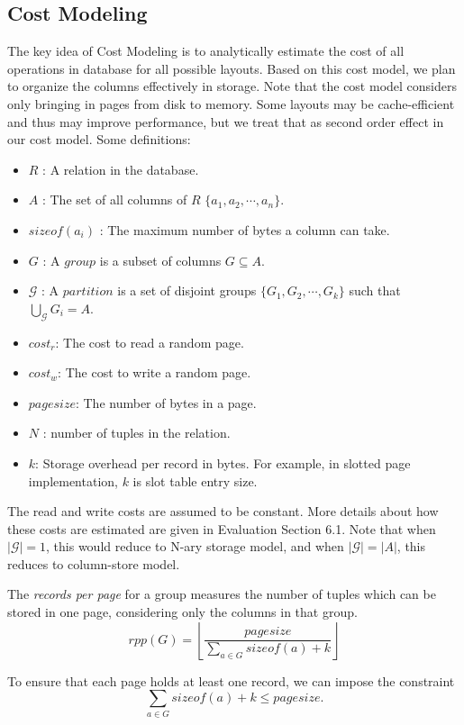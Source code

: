 \documentclass[twocolumn,11pt]{article}
\newcommand{\g}{\mathcal{G}}
\begin{document}
\subsection{Cost Modeling}

The key idea of Cost Modeling is to analytically estimate the cost of all operations in database for all possible layouts. Based on this cost model, we plan to organize the columns effectively in storage. Note that the cost model considers only bringing in pages from disk to memory. Some layouts may be cache-efficient and thus may improve performance, but we treat that as second order effect in our cost model.
Some definitions:
\begin{itemize}
\item $R$	  	: A relation in the database.
\item $A$	  	: The set of all columns of $R$ $\{a_1,a_2,\cdots,a_n\}$.
\item $sizeof(a_i)$ : The maximum number of bytes a column can take.
\item $G$	  	: A $group$ is a subset of columns $G \subseteq A$.
\item $\g$  	:	A $partition$ is a set of disjoint groups $\{G_1,G_2,\cdots,G_k\}$ such that $ \bigcup_{\g} G_i = A$.
\item $cost_r$: The cost to read a random page.
\item $cost_w$: The cost to write a random page.
\item $pagesize$: The number of bytes in a page.
\item $N$     : number of tuples in the relation.
\item $k$: Storage overhead per record in bytes. For example, in slotted page implementation, $k$ is slot table entry size.
\end{itemize}

The read and write costs are assumed to be constant. More details about how
these costs are estimated are given in Evaluation Section 6.1. Note that when
$|\g| = 1$, this would reduce to N-ary storage
model, and when $|\g| = |A|$, this reduces to column-store model.

The {\em records per page} for a group measures the number of tuples which
can be stored in one page, considering only the columns in that group.
\[ rpp(G) = \left\lfloor \frac{pagesize}{ \sum_{a \in G} sizeof(a) + k } \right\rfloor \]

To ensure that each page holds at least one record, we can impose the constraint
\[ \sum_{a \in G} sizeof(a) + k \leq pagesize. \]
\end{document}
